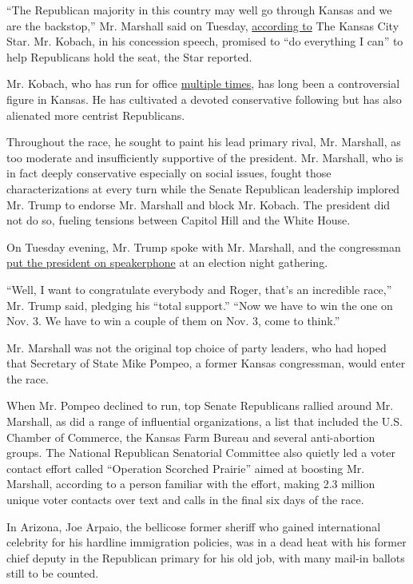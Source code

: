 ``The Republican majority in this country may well go through Kansas and
we are the backstop,'' Mr. Marshall said on Tuesday,
\href{https://www.kansascity.com/news/politics-government/election/article244717957.html}{according
to} The Kansas City Star. Mr. Kobach, in his concession speech, promised
to ``do everything I can'' to help Republicans hold the seat, the Star
reported.

Mr. Kobach, who has run for office
\href{https://www.nytimes.com/2017/06/13/magazine/the-man-behind-trumps-voter-fraud-obsession.html}{multiple
times}, has long been a controversial figure in Kansas. He has
cultivated a devoted conservative following but has also alienated more
centrist Republicans.

Throughout the race, he sought to paint his lead primary rival, Mr.
Marshall, as too moderate and insufficiently supportive of the
president. Mr. Marshall, who is in fact deeply conservative especially
on social issues, fought those characterizations at every turn while the
Senate Republican leadership implored Mr. Trump to endorse Mr. Marshall
and block Mr. Kobach. The president did not do so, fueling tensions
between Capitol Hill and the White House.

On Tuesday evening, Mr. Trump spoke with Mr. Marshall, and the
congressman
\href{https://twitter.com/RogerMarshallMD/status/1290840935807549440?s=20}{put
the president on speakerphone} at an election night gathering.

``Well, I want to congratulate everybody and Roger, that's an incredible
race,'' Mr. Trump said, pledging his ``total support.'' ``Now we have to
win the one on Nov. 3. We have to win a couple of them on Nov. 3, come
to think.''

Mr. Marshall was not the original top choice of party leaders, who had
hoped that Secretary of State Mike Pompeo, a former Kansas congressman,
would enter the race.

When Mr. Pompeo declined to run, top Senate Republicans rallied around
Mr. Marshall, as did a range of influential organizations, a list that
included the U.S. Chamber of Commerce, the Kansas Farm Bureau and
several anti-abortion groups. The National Republican Senatorial
Committee also quietly led a voter contact effort called ``Operation
Scorched Prairie'' aimed at boosting Mr. Marshall, according to a person
familiar with the effort, making 2.3 million unique voter contacts over
text and calls in the final six days of the race.

In Arizona, Joe Arpaio, the bellicose former sheriff who gained
international celebrity for his hardline immigration policies, was in a
dead heat with his former chief deputy in the Republican primary for his
old job, with many mail-in ballots still to be counted.

